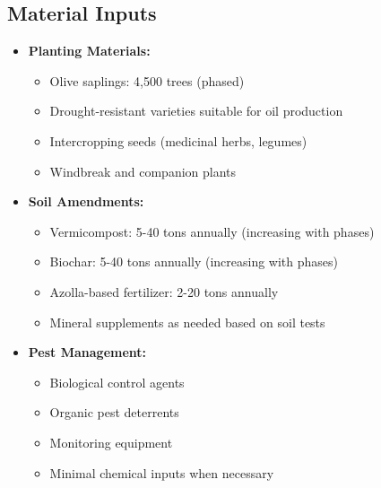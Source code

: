 \subsection{Material Inputs}
\begin{itemize}
    \item \textbf{Planting Materials:}
    \begin{itemize}
        \item Olive saplings: 4,500 trees (phased)
        \item Drought-resistant varieties suitable for oil production
        \item Intercropping seeds (medicinal herbs, legumes)
        \item Windbreak and companion plants
    \end{itemize}
    \item \textbf{Soil Amendments:}
    \begin{itemize}
        \item Vermicompost: 5-40 tons annually (increasing with phases)
        \item Biochar: 5-40 tons annually (increasing with phases)
        \item Azolla-based fertilizer: 2-20 tons annually
        \item Mineral supplements as needed based on soil tests
    \end{itemize}
    \item \textbf{Pest Management:}
    \begin{itemize}
        \item Biological control agents
        \item Organic pest deterrents
        \item Monitoring equipment
        \item Minimal chemical inputs when necessary
    \end{itemize}
\end{itemize}

